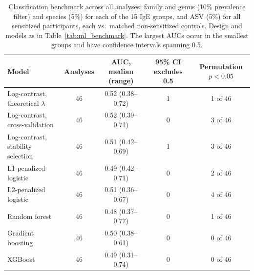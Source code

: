 \begin{table}[h!]
\centering
\footnotesize
\begin{tabular}{l c c c c}
\textbf{Model} & \textbf{Analyses} & \textbf{AUC, median (range)} & \textbf{95\% CI excludes 0.5} & \textbf{Permutation $p<0.05$} \\
\hline
Log-contrast, theoretical $\lambda$ & 46 & 0.52 (0.38--0.72) & 1 & 1 of 46 \\
Log-contrast, cross-validation & 46 & 0.52 (0.39--0.71) & 0 & 3 of 46 \\
Log-contrast, stability selection & 46 & 0.51 (0.42--0.69) & 1 & 3 of 46 \\
L1-penalized logistic & 46 & 0.49 (0.42--0.71) & 0 & 2 of 46 \\
L2-penalized logistic & 46 & 0.51 (0.36--0.67) & 0 & 4 of 46 \\
Random forest & 46 & 0.48 (0.37--0.77) & 0 & 1 of 46 \\
Gradient boosting & 46 & 0.50 (0.38--0.61) & 0 & 0 of 46 \\
XGBoost & 46 & 0.49 (0.31--0.74) & 0 & 0 of 46 \\
\hline
\end{tabular}
\caption{Classification benchmark across all analyses: family and genus (10\% prevalence filter) and species (5\%) for each of the 15 IgE groups, and ASV (5\%) for all sensitized participants, each vs.\ matched non-sensitized controls. Design and models as in Table~\ref{tab:ml_benchmark}. The largest AUCs occur in the smallest groups and have confidence intervals spanning 0.5.\label{tab:ml_benchmark_all}}
\end{table}
